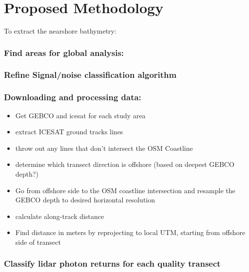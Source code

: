 \hypertarget{proposed-methodology}{%
  \chapter{Proposed Methodology}\label{proposed-methodology}}

To extract the nearshore bathymetry:

\hypertarget{find-areas-for-global-analysis}{%
  \subsection{Find areas for global
    analysis:}\label{find-areas-for-global-analysis}}

\hypertarget{refine-signalnoise-classification-algorithm}{%
  \subsection{Refine Signal/noise classification
    algorithm}\label{refine-signalnoise-classification-algorithm}}

\hypertarget{downloading-and-processing-data}{%
  \subsection{Downloading and processing
    data:}\label{downloading-and-processing-data}}

\begin{itemize}

  \item
        Get GEBCO and icesat for each study area
  \item
        extract ICESAT ground tracks lines
  \item
        throw out any lines that don't intersect the OSM Coastline
  \item
        determine which transect direction is offshore (based on deepest GEBCO
        depth?)
  \item
        Go from offshore side to the OSM coastline intersection and resample
        the GEBCO depth to desired horizontal resolution
  \item
        calculate along-track distance
  \item
        Find distance in meters by reprojecting to local UTM, starting from
        offshore side of transect
\end{itemize}

\hypertarget{classify-lidar-photon-returns-for-each-quality-transect}{%
  \subsection{Classify lidar photon returns for each quality
    transect}\label{classify-lidar-photon-returns-for-each-quality-transect}}

